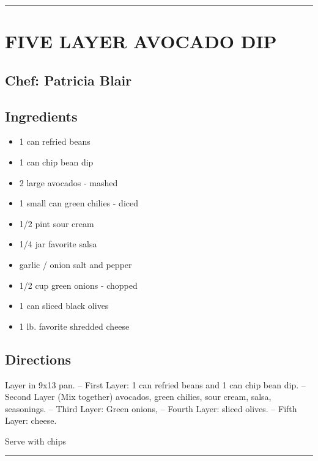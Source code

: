 \documentclass[
]{book}
\providecommand{\tightlist}{%
  \setlength{\itemsep}{0pt}\setlength{\parskip}{0pt}}
\begin{document}
\begin{center}\rule{0.5\linewidth}{0.5pt}\end{center}

\hypertarget{five-layer-avocado-dip}{%
\section*{FIVE LAYER AVOCADO DIP}\label{five-layer-avocado-dip}}


\hypertarget{chef-patricia-blair-2}{%
\subsection*{Chef: Patricia Blair}\label{chef-patricia-blair-2}}


\hypertarget{ingredients-5}{%
\subsection*{Ingredients}\label{ingredients-5}}


\begin{itemize}
\tightlist
\item
  1 can refried beans
\item
  1 can chip bean dip
\item
  2 large avocados - mashed
\item
  1 small can green chilies - diced
\item
  1/2 pint sour cream
\item
  1/4 jar favorite salsa
\item
  garlic / onion salt and pepper
\item
  1/2 cup green onions - chopped
\item
  1 can sliced black olives
\item
  1 lb. favorite shredded cheese
\end{itemize}

\hypertarget{directions-5}{%
\subsection*{Directions}\label{directions-5}}


Layer in 9x13 pan.
-- First Layer: 1 can refried beans and 1 can chip bean dip.
-- Second Layer (Mix together) avocados, green chilies, sour cream, salsa, seasonings.
-- Third Layer: Green onions,
-- Fourth Layer: sliced olives.
-- Fifth Layer: cheese.

Serve with chips

\begin{center}\rule{0.5\linewidth}{0.5pt}\end{center}
\end{document}
